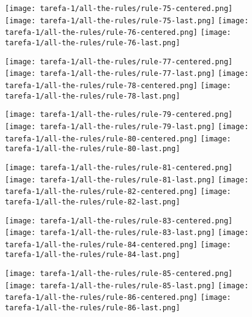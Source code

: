 \begin{figure}[htbp]
  \centering
\texttt{[image: tarefa-1/all-the-rules/rule-75-centered.png]}
\texttt{[image: tarefa-1/all-the-rules/rule-75-last.png]}
\texttt{[image: tarefa-1/all-the-rules/rule-76-centered.png]}
\texttt{[image: tarefa-1/all-the-rules/rule-76-last.png]}
\end{figure}
\begin{figure}[htbp]
  \centering
\texttt{[image: tarefa-1/all-the-rules/rule-77-centered.png]}
\texttt{[image: tarefa-1/all-the-rules/rule-77-last.png]}
\texttt{[image: tarefa-1/all-the-rules/rule-78-centered.png]}
\texttt{[image: tarefa-1/all-the-rules/rule-78-last.png]}
\end{figure}
\begin{figure}[htbp]
  \centering
\texttt{[image: tarefa-1/all-the-rules/rule-79-centered.png]}
\texttt{[image: tarefa-1/all-the-rules/rule-79-last.png]}
\texttt{[image: tarefa-1/all-the-rules/rule-80-centered.png]}
\texttt{[image: tarefa-1/all-the-rules/rule-80-last.png]}
\end{figure}
\begin{figure}[htbp]
  \centering
\texttt{[image: tarefa-1/all-the-rules/rule-81-centered.png]}
\texttt{[image: tarefa-1/all-the-rules/rule-81-last.png]}
\texttt{[image: tarefa-1/all-the-rules/rule-82-centered.png]}
\texttt{[image: tarefa-1/all-the-rules/rule-82-last.png]}
\end{figure}
\begin{figure}[htbp]
  \centering
\texttt{[image: tarefa-1/all-the-rules/rule-83-centered.png]}
\texttt{[image: tarefa-1/all-the-rules/rule-83-last.png]}
\texttt{[image: tarefa-1/all-the-rules/rule-84-centered.png]}
\texttt{[image: tarefa-1/all-the-rules/rule-84-last.png]}
\end{figure}
\begin{figure}[htbp]
  \centering
\texttt{[image: tarefa-1/all-the-rules/rule-85-centered.png]}
\texttt{[image: tarefa-1/all-the-rules/rule-85-last.png]}
\texttt{[image: tarefa-1/all-the-rules/rule-86-centered.png]}
\texttt{[image: tarefa-1/all-the-rules/rule-86-last.png]}
\end{figure}
